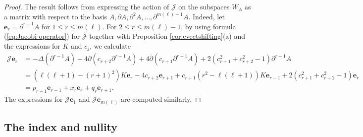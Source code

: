 \documentclass[11pt]{article}
\theoremstyle{definition}
\numberwithin{equation}{section}
\begin{document}
\begin{proof} The result follows from expressing the action of $\mathscr{J}$ on the subspaces $W_A$ as a matrix with respect to the basis $A, \partial A, \partial^2 A, \ldots, \partial^{m(\ell)-1} A$.  Indeed, let $\mathbf{e}_r = \partial^{r-1}A$ for $1 \leq r \leq m(\ell)$.  For $2 \leq r \leq m(\ell)-1$,  by using formula (\ref{eq:Jacobi-operator}) for $\mathscr{J}$ together with Proposition \ref{cor:evectshifting}(a) and the expressions for $K$ and $c_j$, we calculate
    \begin{equation*}
        \begin{aligned}
            \mathscr{J} \mathbf{e}_r &= -\Delta(\partial^{r-1} A) - 4 \partial (c_{r+2} \partial^{r-1} A) + 4 \overline{\partial} (c_{r+1} \partial^{r-1} A ) + 2 (c_{r+1}^2 + c_{r+2}^2 - 1) \partial^{r-1} A \\
            &= \left( \ell (\ell+1) - (r+1)^2 \right) K \mathbf{e}_r - 4 c_{r+2} \mathbf{e}_{r+1} + c_{r+1} (r^2 - \ell (\ell+1))K \mathbf{e}_{r-1} + 2 (c_{r+1}^2 + c_{r+2}^2 - 1) \mathbf{e}_r \\
            &= p_{r-1} \mathbf{e}_{r-1} + x_r \mathbf{e}_r + q_r \mathbf{e}_{r+1}.
        \end{aligned}
    \end{equation*}
    The expressions for $\mathscr{J} \mathbf{e}_1$ and $\mathscr{J} \mathbf{e}_{m(\ell)}$ are computed similarly.
\end{proof}

\subsection{The index and nullity}
\end{document}

